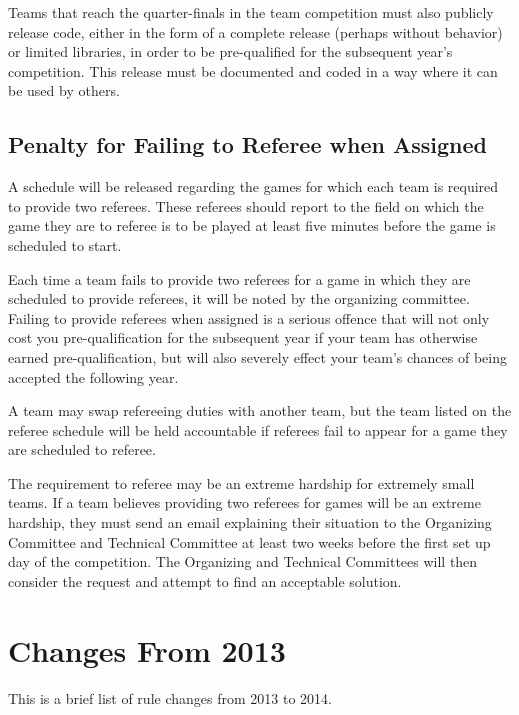 \documentclass[12pt]{article}
\begin{document}
Teams that reach the quarter-finals in the team competition must also publicly release code, either in the form of a complete release (perhaps without behavior) or limited libraries, in order to be pre-qualified for the subsequent year's competition.  This release must be documented and coded in a way where it can be used by others.

\subsection{Penalty for Failing to Referee when Assigned}
\label{sec:refPenalty}
A schedule will be released regarding the games for which each team is required to provide two referees.  These referees should report to the field on which the game they are to referee is to be played at least five minutes before the game is scheduled to start.

Each time a team fails to provide two referees for a game in which they are scheduled to provide referees, it will be noted by the organizing committee.  Failing to provide referees when assigned is a serious offence that will not only cost you pre-qualification for the subsequent year if your team has otherwise earned pre-qualification, but will also severely effect your team's chances of being accepted the following year.

A team may swap refereeing duties with another team, but the team listed on the referee schedule will be held accountable if referees fail to appear for a game they are scheduled to referee.

The requirement to referee may be an extreme hardship for extremely small teams.  If a team believes providing two referees for games will be an extreme hardship, they must send an email explaining their situation to the Organizing Committee and Technical Committee at least two weeks before the first set up day of the competition.  The Organizing and Technical Committees will then consider the request and attempt to find an acceptable solution.


\section{Changes From 2013}
This is a brief list of rule changes from 2013 to 2014.
\end{document}
